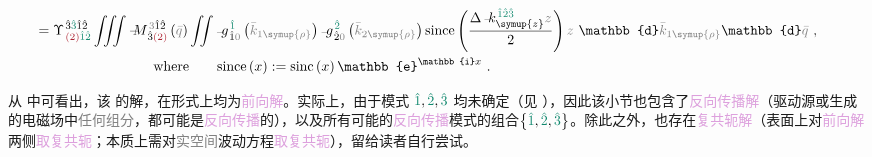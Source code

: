 \begin{subequations}
\begin{align}
	\hspace{-1.25em} &\hspace{-0.5em}= \Upsilon^{\;\! \hat{3} \textcolor{PineGreen}{\hat{3}} \hat{1} \hat{2} }_{\;\! \textcolor{Maroon}{(2)} \textcolor{PineGreen}{\hat{1} \hat{2}} } \iiint \Xint{\mathcolor{gray}{-}}{18}{M}^{\;\! \mathcolor{gray}{3} \hat{1} \hat{2} }_{\;\! \hat{3} \textcolor{Maroon}{(2)} } \left( \mathcolor{gray}{\bar{q}} \right) \iint \Xint{{}^{}_{\mathcolor{gray}{-}}}{10}{g}^{\;\! \textcolor{PineGreen}{\hat{1}}}_{\;\! \hat{1} \mathcolor{gray}{0}} \left( \mathcolor{gray}{\bar{k}_{1\symup{\rho}}} \right) \Xint{{}^{}_{\mathcolor{gray}{-}}}{10}{g}^{\;\! \textcolor{PineGreen}{\hat{2}}}_{\;\! \hat{2} \mathcolor{gray}{0}} \left( \mathcolor{gray}{\bar{k}_{2\symup{\rho}}} \right) \text{since} \left( \frac{ \Delta \Xint{\begin{smallmatrix} ~ \\ {}^{}_{\mathcolor{gray}{-}} \\ ~ \end{smallmatrix}}{15}{k}_{\symup{z}}^{\;\! \textcolor{PineGreen}{\hat{1} \hat{2} \hat{3}} } \mathcolor{gray}{z} }{ 2 } \right) \mathcolor{gray}{z} ~ \mathbb{d} \mathcolor{gray}{\bar{k}_{1\symup{\rho}}} \mathbb{d} \mathcolor{gray}{\bar{q}} ~, \label{eq:up-scalar-g-EE-312-discrete-since2} \\
	\hspace{-1.25em} &\hspace{8em} \text{where} ~~~~~~ \text{since} \left( x \right) := \text{sinc} \left( x \right) \mathbb{e}^{\mathbb{i} x } ~. \label{eq:up-scalar-g-EE-312-discrete-since3}
\end{align}
\end{subequations}

从  中可看出，该  的解，在形式上均为\textcolor{Plum}{前向解}。实际上，由于\textcolor{PineGreen}{模式} $\textcolor{PineGreen}{\hat{1}}, \textcolor{PineGreen}{\hat{2}},\textcolor{PineGreen}{\hat{3}}$ 均未确定（见 ），因此该小节也包含了\textcolor{Plum}{反向传播解}（\textcolor{NavyBlue}{驱动源}或生成的电磁场中\textcolor{gray}{任何组分}，都可能是\textcolor{Plum}{反向传播}的），以及所有可能的\textcolor{Plum}{反向传播}\textcolor{PineGreen}{模式}的组合$\left\{ \textcolor{PineGreen}{\hat{1}}, \textcolor{PineGreen}{\hat{2}},\textcolor{PineGreen}{\hat{3}} \right\}$。除此之外，也存在\textcolor{Plum}{复共轭解}（表面上对\textcolor{Plum}{前向解}两侧\textcolor{Plum}{取复共轭}；本质上需对\textcolor{gray}{实空间}波动方程\textcolor{Plum}{取复共轭}），留给读者自行尝试。

